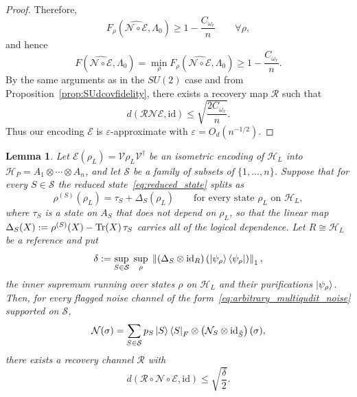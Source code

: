 \documentclass[11pt,letterpaper]{article}
\theoremstyle{plain}
\theoremstyle{plain}
\theoremstyle{plain}
\theoremstyle{plain}
\theoremstyle{plain}
\theoremstyle{plain}
\theoremstyle{plain}
\newtheorem{smlemma}[smtheorem]{Lemma}
\theoremstyle{definition}
\theoremstyle{plain}
\begin{document}
\begin{proof}
Therefore,
\[
F_\rho(\widehat{\mathcal{N} \circ \mathcal{E}},\Lambda_0)
\geq
1-\frac{C_{\omega_r}}{n}
\qquad
\forall \rho ,
\]
and hence
\[
F(\widehat{\mathcal{N} \circ \mathcal{E}},\Lambda_0)
=
\min_\rho F_\rho(\widehat{\mathcal{N} \circ \mathcal{E}},\Lambda_0)
\geq
1-\frac{C_{\omega_r}}{n}.
\]
By the same arguments as in the \(SU(2)\) case and from Proposition~\ref{prop:SUdcovfidelity}, there exists a recovery map \(\mathcal R\) such that
\[
d(\mathcal R\mathcal N\mathcal E,\mathrm{id})
\leq
\sqrt{\frac{2C_{\omega_r}}{n}}.
\]
Thus our encoding \(\mathcal E\) is \(\varepsilon\)-approximate with \(\varepsilon=O_{d}(n^{-1/2})\).

\end{proof}

\begin{smlemma}\label{lem:arb_noise_from_leakage}
    Let $\mathcal E(\rho_L)=\mathcal{V}\rho_L\mathcal{V}^\dagger$ be an isometric encoding of $\mathcal H_L$ into $\mathcal H_P=A_1\otimes\cdots\otimes A_n$, 
    and let $\mathcal S$ be a family of subsets of $\{1,\ldots,n\}$. 
    Suppose that for every $S\in\mathcal S$ the reduced state~\eqref{eq:reduced_state} splits as
    \begin{equation}
    \label{eq:leakage-splitting}
        \rho^{(S)}(\rho_L)=\tau_S+\Delta_S(\rho_L)
        \qquad\text{for every state }\rho_L\text{ on }\mathcal H_L,
    \end{equation}
    where $\tau_S$ is a state on $A_S$ that does not depend on $\rho_L$, so that the linear map $\Delta_S(X):=\rho^{(S)}(X)-\Tr(X)\,\tau_S$ carries all of the logical dependence. 
    Let $R\cong\mathcal H_L$ be a reference and put
    \begin{equation}
    \label{eq:uniform-leakage}
        \delta
        :=
        \sup_{S\in\mathcal S}\;
        \sup_{\rho}\;
        \left\|
            (\Delta_S\otimes\mathrm{id}_R)
            \left(\ket{\psi_\rho}\bra{\psi_\rho}\right)
        \right\|_1,
    \end{equation}
    the inner supremum running over states $\rho$ on $\mathcal H_L$ and their purifications $\ket{\psi_\rho}$. 
    Then, for every flagged noise channel of the form~\eqref{eq:arbitrary_multiqudit_noise} supported on $\mathcal S$,
    \[
        \mathcal N(\sigma)
        =
        \sum_{S\in\mathcal S}
        p_S
        \ket S\bra S_F
        \otimes
        \left(\mathcal N_S\otimes\mathrm{id}_{\hat S}\right)(\sigma),
    \]
    there exists a recovery channel $\mathcal R$ with
    \begin{equation}
    \label{eq:arb-noise-bound}
        d(\mathcal R\circ\mathcal N\circ\mathcal E,\mathrm{id})
        \le
        \sqrt{\frac\delta2}.
    \end{equation}
\end{smlemma}
\end{document}
